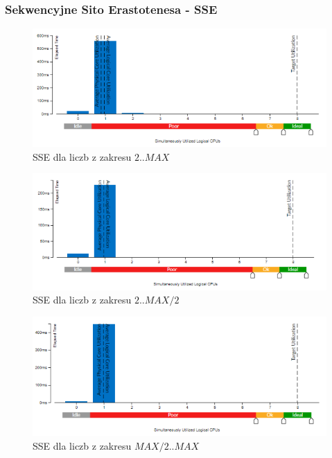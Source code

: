 \documentclass{article}
\begin{document}
            \subsubsection{Sekwencyjne Sito Erastotenesa - \gls{SSE}}
                \begin{figure}[H]
                    \includegraphics[width=13cm]{sekwencyjny_sito_2_MAX}
                    \caption{\gls{SSE} dla liczb z zakresu $2 .. MAX$}
                \end{figure}
                \begin{figure}[H]
                    \includegraphics[width=13cm]{sekwencyjny_sito_2_MAX2}
                    \caption{\gls{SSE} dla liczb z zakresu $2 .. MAX / 2$}
                \end{figure}
                \begin{figure}[H]
                    \includegraphics[width=13cm]{sekwencyjny_sito_MAX2_MAX}
                    \caption{\gls{SSE} dla liczb z zakresu $MAX / 2 .. MAX$}
                \end{figure}
        
\end{document}

